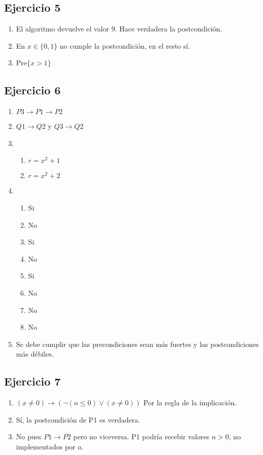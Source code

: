 \subsection{Ejercicio 5}
\begin{enumerate}[label=(\alph*)]
    \item El algoritmo devuelve el valor $9$. Hace verdadera la postcondición.
    \item En $x \in \{0,1\}$ no cumple la postcondición, en el resto sí.
    \item Pre$\{ x > 1 \}$
\end{enumerate}

\subsection{Ejercicio 6}
\begin{enumerate}[label=(\alph*)]
    \item $P3 \rightarrow P1 \rightarrow P2$
    \item $Q1 \rightarrow Q2$ y $Q3 \rightarrow Q2$
    \item \begin{enumerate}
        \item $r = x^2 + 1$
        \item $r = x^2 + 2$
    \end{enumerate}
    \item \begin{enumerate}
        \item Si
        \item No
        \item Si
        \item No
        \item Si
        \item No
        \item No
        \item No
    \end{enumerate}
    \item Se debe cumplir que las precondiciones sean más fuertes y las postcondiciones más débiles.
\end{enumerate}

\subsection{Ejercicio 7}
\begin{enumerate}
    \item $(x\neq 0) \rightarrow (\neg(n \leq 0) \vee (x \neq 0))$ Por la regla de la implicación.
    \item Sí, la postcondición de P1 es verdadera.
    \item No pues $P1 \rightarrow P2$ pero no viceversa. P1 podría recebir valores $n>0$, no implementados por $a$.
\end{enumerate}

